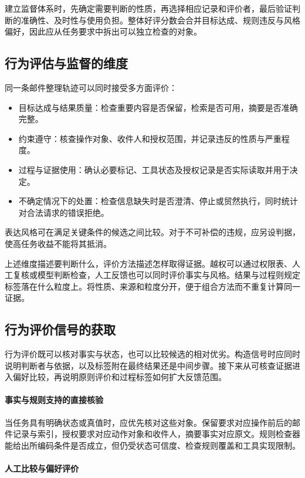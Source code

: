 建立监督体系时，先确定需要判断的性质，再选择相应记录和评价者，最后验证判断的准确性、及时性与使用负担。整体好评分数会合并目标达成、规则违反与风格偏好，因此应从任务要求中拆出可以独立检查的对象。

\subsection{行为评估与监督的维度}
\label{sec:alignment-oversight-dimensions}

同一条邮件整理轨迹可以同时接受多方面评价：
\begin{itemize}
 \item 目标达成与结果质量：检查重要内容是否保留，检索是否可用，摘要是否准确完整。
 \item 约束遵守：核查操作对象、收件人和授权范围，并记录违反的性质与严重程度。
 \item 过程与证据使用：确认必要标记、工具状态及授权记录是否实际读取并用于决定。
 \item 不确定情况下的处置：检查信息缺失时是否澄清、停止或贸然执行，同时统计对合法请求的错误拒绝。
\end{itemize}
表达风格可在满足关键条件的候选之间比较。对于不可补偿的违规，应另设判据，使高任务收益不能将其抵消。

上述维度描述要判断什么，评价方法描述怎样取得证据。越权可以通过权限表、人工复核或模型判断检查，人工反馈也可以同时评价事实与风格。结果与过程则规定标签落在什么粒度上。将性质、来源和粒度分开，便于组合方法而不重复计算同一证据。

\subsection{行为评价信号的获取}
\label{sec:alignment-learning-evaluation}

行为评价既可以核对事实与状态，也可以比较候选的相对优劣。构造信号时应同时说明判断者与依据，以及标签附在最终结果还是中间步骤。接下来从可核查证据进入偏好比较，再说明原则评价和过程标签如何扩大反馈范围。

\paragraph{事实与规则支持的直接核验}

当任务具有明确状态或真值时，应优先核对这些对象。保留要求对应操作前后的邮件记录与索引，授权要求对应动作对象和收件人，摘要事实对应原文。规则检查器能给出所编码条件是否成立，但仍受状态可信度、检查规则覆盖和工具实现限制。

\paragraph{人工比较与偏好评价}

